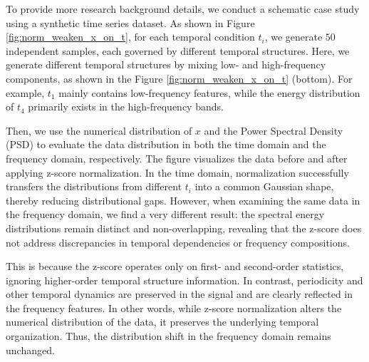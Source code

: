 \documentclass[sigconf,anonymous,review]{acmart}
\begin{document}
To provide more research background details, we conduct a schematic case study using a synthetic time series dataset.
As shown in Figure \ref{fig:norm_weaken_x_on_t}, for each temporal condition $t_i$, we generate $50$ independent samples, each governed by different temporal structures.
Here, we generate different temporal structures by mixing low- and high-frequency components, as shown in the Figure \ref{fig:norm_weaken_x_on_t} (bottom).
For example, $t_1$ mainly contains low-frequency features, while the energy distribution of $t_4$ primarily exists in the high-frequency bands.

Then, we use the numerical distribution of $x$ and the Power Spectral Density (PSD) to evaluate the data distribution in both the time domain and the frequency domain, respectively.
The figure visualizes the data before and after applying z-score normalization. 
In the time domain, normalization successfully transfers the distributions from different $t_i$ into a common Gaussian shape, thereby reducing distributional gaps. 
However, when examining the same data in the frequency domain, we find a very different result: the spectral energy distributions remain distinct and non-overlapping, revealing that the z-score does not address discrepancies in temporal dependencies or frequency compositions. 

This is because the z-score operates only on first- and second-order statistics, ignoring higher-order temporal structure information. 
In contrast, periodicity and other temporal dynamics are preserved in the signal and are clearly reflected in the frequency features. 
In other words, while z-score normalization alters the numerical distribution of the data, it preserves the underlying temporal organization.
Thus, the distribution shift in the frequency domain remains unchanged.
\end{document}
